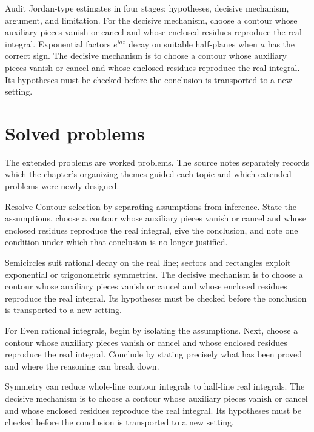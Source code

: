 \begin{example}\label{ex:iv11-worked-04}
Audit Jordan-type estimates in four stages: hypotheses, decisive mechanism, argument, and limitation. For the decisive mechanism, choose a contour whose auxiliary pieces vanish or cancel and whose enclosed residues reproduce the real integral. Exponential factors $e^{iaz}$ decay on suitable half-planes when $a$ has the correct sign. The decisive mechanism is to choose a contour whose auxiliary pieces vanish or cancel and whose enclosed residues reproduce the real integral. Its hypotheses must be checked before the conclusion is transported to a new setting.
\end{example}

\section{Solved problems}
The extended problems are worked problems. The source notes separately records which the chapter's organizing themes guided each topic and which extended problems were newly designed.

\begin{problem}\label{prob:iv11-problem-01}
Resolve Contour selection by separating assumptions from inference. State the assumptions, choose a contour whose auxiliary pieces vanish or cancel and whose enclosed residues reproduce the real integral, give the conclusion, and note one condition under which that conclusion is no longer justified.
\end{problem}
\begin{solution}
Semicircles suit rational decay on the real line; sectors and rectangles exploit exponential or trigonometric symmetries. The decisive mechanism is to choose a contour whose auxiliary pieces vanish or cancel and whose enclosed residues reproduce the real integral. Its hypotheses must be checked before the conclusion is transported to a new setting.
\end{solution}

\begin{problem}\label{prob:iv11-problem-02}
For Even rational integrals, begin by isolating the assumptions. Next, choose a contour whose auxiliary pieces vanish or cancel and whose enclosed residues reproduce the real integral. Conclude by stating precisely what has been proved and where the reasoning can break down.
\end{problem}
\begin{solution}
Symmetry can reduce whole-line contour integrals to half-line real integrals. The decisive mechanism is to choose a contour whose auxiliary pieces vanish or cancel and whose enclosed residues reproduce the real integral. Its hypotheses must be checked before the conclusion is transported to a new setting.
\end{solution}

